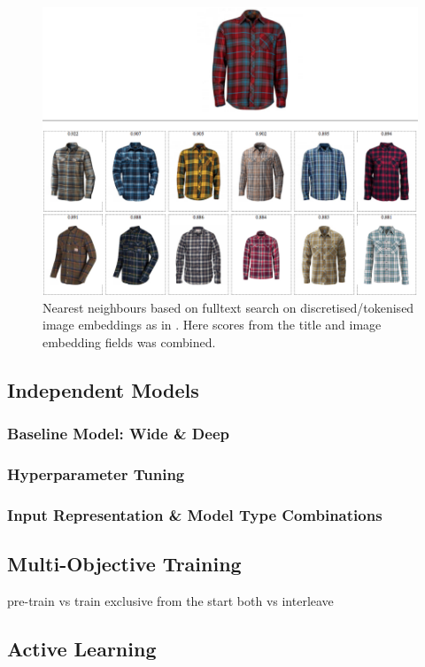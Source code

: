 \begin{figure}
  \includegraphics[width=\linewidth]{figures/compare/shirt_nmslib}
  \caption{Nearest neighbours based on fulltext search on discretised/tokenised image embeddings as in \cite{vec_fulltext}. Here scores from the title and image embedding fields was combined.}
  \label{chair_tokenised}
\end{figure}

\subsection{Independent Models}
\label{exp_models}

\subsubsection{Baseline Model: Wide \& Deep}

\subsubsection{Hyperparameter Tuning}

\subsubsection{Input Representation \& Model Type Combinations}

\subsection{Multi-Objective Training}
\label{multiobj}

pre-train vs train exclusive from the start
both vs interleave

\subsection{Active Learning}
\label{exp_al}
